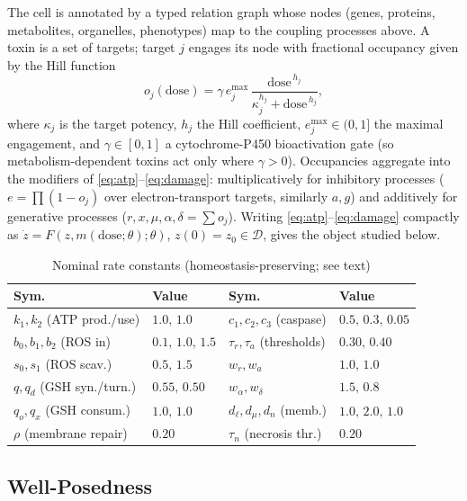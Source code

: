 \documentclass[journal]{IEEEtran}
\begin{document}
The cell is annotated by a typed relation graph whose nodes (genes, proteins,
metabolites, organelles, phenotypes) map to the coupling processes above. A toxin
is a set of targets; target $j$ engages its node with fractional occupancy given
by the Hill function
\begin{equation}
o_j(\text{dose}) = \gamma\, e_j^{\max}\,\frac{\text{dose}^{\,h_j}}{\kappa_j^{h_j}+\text{dose}^{\,h_j}}, \label{eq:hill}
\end{equation}
where $\kappa_j$ is the target potency, $h_j$ the Hill coefficient, $e_j^{\max}\in(0,1]$
the maximal engagement, and $\gamma\in[0,1]$ a cytochrome-P450 bioactivation gate
(so metabolism-dependent toxins act only where $\gamma>0$). Occupancies aggregate
into the modifiers of \eqref{eq:atp}--\eqref{eq:damage}: multiplicatively for
inhibitory processes ($e=\prod(1-o_j)$ over electron-transport targets, similarly
$a,g$) and additively for generative processes ($r,x,\mu,\alpha,\delta=\sum o_j$).
Writing \eqref{eq:atp}--\eqref{eq:damage} compactly as
$\dot z=F(z,m(\text{dose};\theta);\theta)$, $z(0)=z_0\in\mathcal{D}$, gives the
object studied below.

\begin{table}[!t]
\renewcommand{\arraystretch}{1.1}
\caption{Nominal rate constants (homeostasis-preserving; see text)}
\label{tab:params}
\centering
\footnotesize
\begin{tabular}{@{}llll@{}}
\toprule
Sym. & Value & Sym. & Value \\
\midrule
$k_1,k_2$ (ATP prod./use) & $1.0,\,1.0$ & $c_1,c_2,c_3$ (caspase) & $0.5,\,0.3,\,0.05$\\
$b_0,b_1,b_2$ (ROS in) & $0.1,\,1.0,\,1.5$ & $\tau_r,\tau_a$ (thresholds) & $0.30,\,0.40$\\
$s_0,s_1$ (ROS scav.) & $0.5,\,1.5$ & $w_r,w_a$ & $1.0,\,1.0$\\
$q,q_d$ (GSH syn./turn.) & $0.55,\,0.50$ & $w_\alpha,w_\delta$ & $1.5,\,0.8$\\
$q_o,q_x$ (GSH consum.) & $1.0,\,1.0$ & $d_\ell,d_\mu,d_n$ (memb.) & $1.0,\,2.0,\,1.0$\\
$\rho$ (membrane repair) & $0.20$ & $\tau_n$ (necrosis thr.) & $0.20$\\
\bottomrule
\end{tabular}
\end{table}

\subsection{Well-Posedness}
\end{document}
